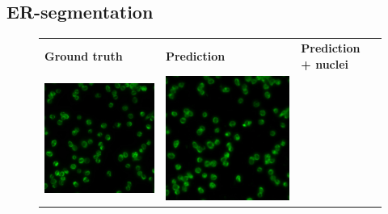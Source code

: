 \subsection{ER-segmentation}

\begin{figure}[H]
    \centering
    \centering
        \begin{tabularx}{\textwidth}{YYYY}
            \textbf{Ground truth} &
            \textbf{Prediction} &
            \textbf{Prediction + nuclei} \\
            \includegraphics{bilder/ER/gt.jpg} & \includegraphics{bilder/ER/er.jpg} &

\end{tabularx}
\end{figure}

